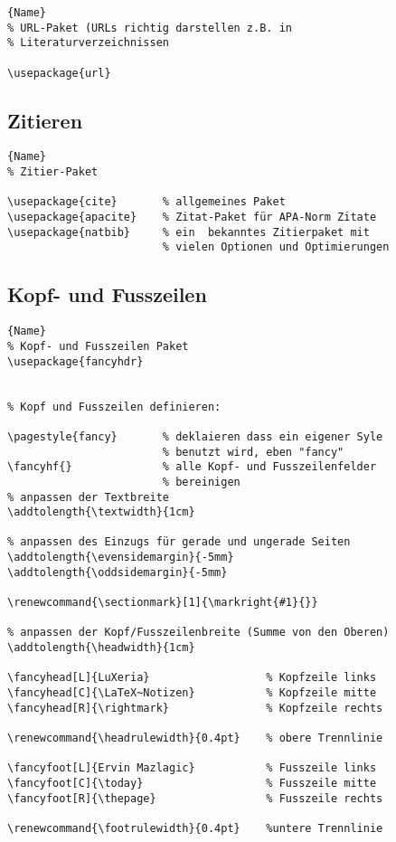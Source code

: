 \begin{center}
\begin{lstlisting}[caption=Auflistungen]{Name}
% URL-Paket (URLs richtig darstellen z.B. in
% Literaturverzeichnissen

\usepackage{url}
\end{lstlisting}
\end{center}

\subsection{Zitieren}

\begin{center}
\begin{lstlisting}[caption=Zitieren]{Name}
% Zitier-Paket

\usepackage{cite}       % allgemeines Paket
\usepackage{apacite}    % Zitat-Paket für APA-Norm Zitate
\usepackage{natbib}     % ein  bekanntes Zitierpaket mit
                        % vielen Optionen und Optimierungen
\end{lstlisting}
\end{center}

\subsection{Kopf- und Fusszeilen}

\begin{center}
\begin{lstlisting}[caption=Kopf- und Fusszeilen]{Name}
% Kopf- und Fusszeilen Paket
\usepackage{fancyhdr}


% Kopf und Fusszeilen definieren:

\pagestyle{fancy}       % deklaieren dass ein eigener Syle
                        % benutzt wird, eben "fancy"
\fancyhf{}              % alle Kopf- und Fusszeilenfelder
                        % bereinigen
% anpassen der Textbreite
\addtolength{\textwidth}{1cm}           

% anpassen des Einzugs für gerade und ungerade Seiten
\addtolength{\evensidemargin}{-5mm}
\addtolength{\oddsidemargin}{-5mm}

\renewcommand{\sectionmark}[1]{\markright{#1}{}}

% anpassen der Kopf/Fusszeilenbreite (Summe von den Oberen)
\addtolength{\headwidth}{1cm}           

\fancyhead[L]{LuXeria}                  % Kopfzeile links
\fancyhead[C]{\LaTeX~Notizen}           % Kopfzeile mitte
\fancyhead[R]{\rightmark}               % Kopfzeile rechts

\renewcommand{\headrulewidth}{0.4pt}    % obere Trennlinie

\fancyfoot[L]{Ervin Mazlagic}           % Fusszeile links
\fancyfoot[C]{\today}                   % Fusszeile mitte
\fancyfoot[R]{\thepage}                 % Fusszeile rechts

\renewcommand{\footrulewidth}{0.4pt}    %untere Trennlinie
\end{lstlisting}
\end{center}




